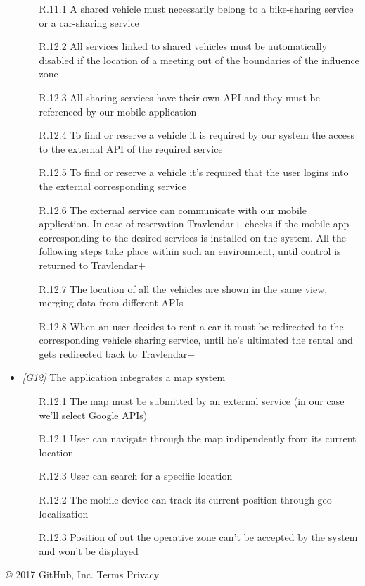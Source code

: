 \begin{itemize}
                   \begin{itemize}
                        \item [R.11.1] A shared vehicle must necessarily belong to a bike-sharing service or a car-sharing service
                        \item [R.12.2] All services linked to shared vehicles must be automatically disabled if the location of a meeting out of the boundaries of the influence zone
                        \item [R.12.3] All sharing services have their own API and they must be referenced by our mobile application
                        \item [R.12.4] To find or reserve a vehicle it is required by our system the access to the external API of the required service
                        \item [R.12.5] To find or reserve a vehicle it's required that the user logins into the external corresponding service
                        \item [R.12.6] The external service can communicate with our mobile application. In case of reservation Travlendar+ checks if the mobile app corresponding to the desired services is installed on the system. All the following steps take place within such an environment, until control is returned to Travlendar+
                        \item [R.12.7] The location of all the vehicles are shown in the same view, merging data from different APIs
                        \item [R.12.8] When an user decides to rent a car it must be redirected to the corresponding vehicle sharing service, until he's ultimated the rental and gets redirected back to Travlendar+
                        \end{itemize}

\item \textit{[G12]} The application integrates a map system
                   
                  \begin{itemize}
                        \item [R.12.1] The map must be submitted by an external service (in our case we'll select Google APIs)
                        \item [R.12.1] User can navigate through the map indipendently from its current location
                        \item [R.12.3] User can search for a specific location
                        \item [R.12.2] The mobile device can track its current position through geo-localization
                        \item [R.12.3] Position of out the operative zone can't be accepted by the system and won't be displayed
                   \end{itemize}


            \end{itemize}



\vfill
© 2017 GitHub, Inc.
Terms
Privacy